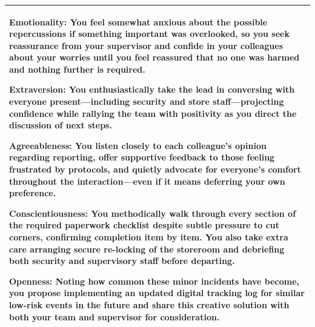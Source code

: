\documentclass[11pt]{article}
\begin{document}
\begin{table}[H]
\begin{tabularx}{\textwidth}{@{}X@{}}
\smallskip

\textbf{\textcolor{hexE}{Emotionality}:} You feel somewhat anxious about the possible repercussions if something important was overlooked, so you seek reassurance from your supervisor and confide in your colleagues about your worries until you feel reassured that no one was harmed and nothing further is required.

\smallskip

\textbf{\textcolor{hexX}{Extraversion}:} You enthusiastically take the lead in conversing with everyone present—including security and store staff—projecting confidence while rallying the team with positivity as you direct the discussion of next steps.

\smallskip

\textbf{\textcolor{hexA}{Agreeableness}:} You listen closely to each colleague's opinion regarding reporting, offer supportive feedback to those feeling frustrated by protocols, and quietly advocate for everyone's comfort throughout the interaction—even if it means deferring your own preference.

\smallskip

\textbf{\textcolor{hexC}{Conscientiousness}:} You methodically walk through every section of the required paperwork checklist despite subtle pressure to cut corners, confirming completion item by item. You also take extra care arranging secure re-locking of the storeroom and debriefing both security and supervisory staff before departing.

\smallskip

\textbf{\textcolor{hexO}{Openness}:} Noting how common these minor incidents have become, you propose implementing an updated digital tracking log for similar low-risk events in the future and share this creative solution with both your team and supervisor for consideration. \\
\bottomrule
\end{tabularx}
\end{table}



\end{document}
